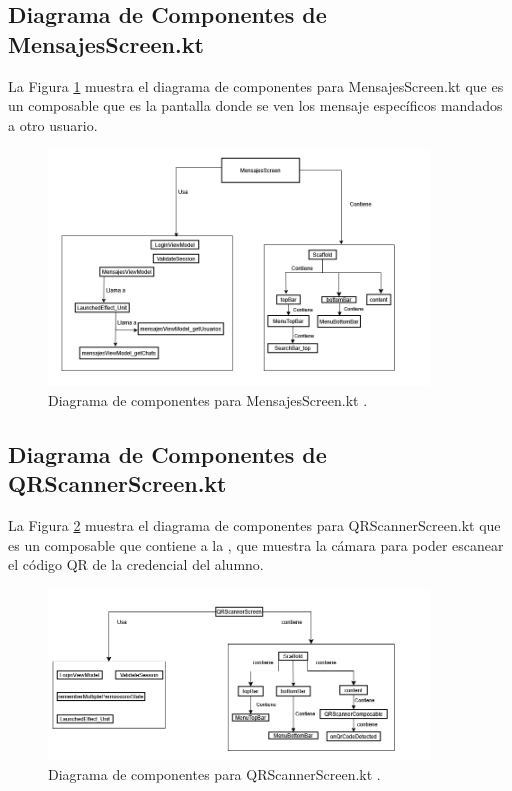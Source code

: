\newpage

\subsection{Diagrama de Componentes de MensajesScreen.kt}

La Figura \ref{fig:Componentes_15} muestra el diagrama de componentes para MensajesScreen.kt que es un composable que es la pantalla donde se ven los mensaje específicos mandados a otro usuario.

\begin{figure}[htbp!]
	\begin{center}
		\includegraphics[width=0.9\textwidth]{DiagramasMoviles/DCM (28)}
		\caption{Diagrama de componentes para MensajesScreen.kt .}
		\label{fig:Componentes_15}
	\end{center}
\end{figure}

\newpage

\subsection{Diagrama de Componentes de QRScannerScreen.kt}

La Figura \ref{fig:Componentes_16} muestra el diagrama de componentes para QRScannerScreen.kt que es un composable que contiene a la , que muestra la cámara para poder escanear el código QR de la credencial del alumno.

\begin{figure}[htbp!]
	\begin{center}
		\includegraphics[width=0.9\textwidth]{DiagramasMoviles/DCM (29)}
		\caption{Diagrama de componentes para QRScannerScreen.kt .}
		\label{fig:Componentes_16}
	\end{center}
\end{figure}

